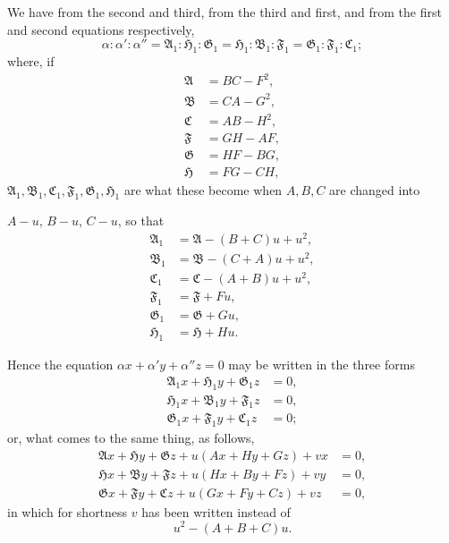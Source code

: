 \documentclass[11pt]{article}
\begin{document}
We have from the second and third, from the third and first, and from the first and second equations respectively,
\[
\alpha : \alpha' : \alpha'' = \mathfrak{A}_1 : \mathfrak{H}_1 : \mathfrak{G}_1 = \mathfrak{H}_1 : \mathfrak{B}_1 : \mathfrak{F}_1 = \mathfrak{G}_1 : \mathfrak{F}_1 : \mathfrak{C}_1;
\]
where, if
\begin{align*}
\mathfrak{A} &= BC - F^2,\\
\mathfrak{B} &= CA - G^2,\\
\mathfrak{C} &= AB - H^2,\\
\mathfrak{F} &= GH - AF,\\
\mathfrak{G} &= HF - BG,\\
\mathfrak{H} &= FG - CH,
\end{align*}
$\mathfrak{A}_1, \mathfrak{B}_1, \mathfrak{C}_1, \mathfrak{F}_1, \mathfrak{G}_1, \mathfrak{H}_1$ are what these become when $A, B, C$ are changed into

\newpage
\setcounter{page}{256}

$A - u$, $B - u$, $C - u$, so that
\begin{align*}
\mathfrak{A}_1 &= \mathfrak{A} - (B + C)u + u^2,\\
\mathfrak{B}_1 &= \mathfrak{B} - (C + A)u + u^2,\\
\mathfrak{C}_1 &= \mathfrak{C} - (A + B)u + u^2,\\
\mathfrak{F}_1 &= \mathfrak{F} + Fu,\\
\mathfrak{G}_1 &= \mathfrak{G} + Gu,\\
\mathfrak{H}_1 &= \mathfrak{H} + Hu.
\end{align*}

Hence the equation $\alpha x + \alpha' y + \alpha'' z = 0$ may be written in the three forms
\begin{align*}
\mathfrak{A}_1 x + \mathfrak{H}_1 y + \mathfrak{G}_1 z &= 0,\\
\mathfrak{H}_1 x + \mathfrak{B}_1 y + \mathfrak{F}_1 z &= 0,\\
\mathfrak{G}_1 x + \mathfrak{F}_1 y + \mathfrak{C}_1 z &= 0;
\end{align*}
or, what comes to the same thing, as follows,
\begin{align*}
\mathfrak{A}x + \mathfrak{H}y + \mathfrak{G}z + u(Ax + Hy + Gz) + vx &= 0,\\
\mathfrak{H}x + \mathfrak{B}y + \mathfrak{F}z + u(Hx + By + Fz) + vy &= 0,\\
\mathfrak{G}x + \mathfrak{F}y + \mathfrak{C}z + u(Gx + Fy + Cz) + vz &= 0,
\end{align*}
in which for shortness $v$ has been written instead of
\[
u^2 - (A + B + C)u.
\]
\end{document}
